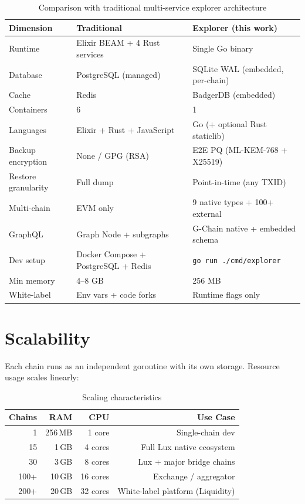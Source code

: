 \documentclass[11pt,a4paper]{article}
\begin{document}
\begin{table}[H]
\centering
\begin{tabularx}{\textwidth}{lXX}
\toprule
\textbf{Dimension} & \textbf{Traditional} & \textbf{Explorer (this work)} \\
\midrule
Runtime & Elixir BEAM + 4 Rust services & Single Go binary \\
Database & PostgreSQL (managed) & SQLite WAL (embedded, per-chain) \\
Cache & Redis & BadgerDB (embedded) \\
Containers & 6 & 1 \\
Languages & Elixir + Rust + JavaScript & Go (+ optional Rust staticlib) \\
Backup encryption & None / GPG (RSA) & E2E PQ (ML-KEM-768 + X25519) \\
Restore granularity & Full dump & Point-in-time (any TXID) \\
Multi-chain & EVM only & 9 native types + 100+ external \\
GraphQL & Graph Node + subgraphs & G-Chain native + embedded schema \\
Dev setup & Docker Compose + PostgreSQL + Redis & \texttt{go run ./cmd/explorer} \\
Min memory & 4--8 GB & 256 MB \\
White-label & Env vars + code forks & Runtime flags only \\
\bottomrule
\end{tabularx}
\caption{Comparison with traditional multi-service explorer architecture}
\end{table}

\section{Scalability}

Each chain runs as an independent goroutine with its own storage. Resource usage scales
linearly:

\begin{table}[H]
\centering
\begin{tabular}{rrrr}
\toprule
\textbf{Chains} & \textbf{RAM} & \textbf{CPU} & \textbf{Use Case} \\
\midrule
1 & 256\,MB & 1 core & Single-chain dev \\
15 & 1\,GB & 4 cores & Full Lux native ecosystem \\
30 & 3\,GB & 8 cores & Lux + major bridge chains \\
100+ & 10\,GB & 16 cores & Exchange / aggregator \\
200+ & 20\,GB & 32 cores & White-label platform (Liquidity) \\
\bottomrule
\end{tabular}
\caption{Scaling characteristics}
\end{table}
\end{document}
